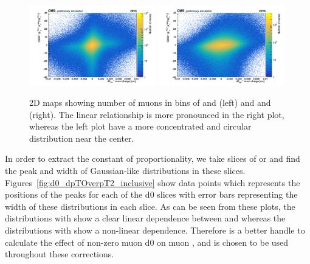 \begin{figure}[h!]
    \centering
    \includegraphics[width=0.49\textwidth]{images_geofit/2D_d0_PV_dpTOverpT2_lowRes.pdf}
    \includegraphics[width=0.49\textwidth]{images_geofit/2D_d0_BS_dpTOverpT2_lowRes.pdf}
    \caption{2D maps showing number of muons in bins of \dptoverptsquare and \dzeroPV (left) and \dptoverptsquare and \dzeroBS (right). The linear relationship is more pronounced in the right plot, whereas the left plot have a more concentrated and circular distribution near the center.}
    \label{fig:2D_d0_dpTOverpT2_inclusive}
\end{figure}

In order to extract the constant of proportionality, we take slices of \dzeroPV or \dzeroBS and find the peak and width of Gaussian-like \dptoverptsquare distributions in these slices. Figures~\ref{fig:d0_dpTOverpT2_inclusive} show data points which represents the positions of the peaks for each of the d0 slices with error bars representing the width of these distributions in each slice. As can be seen from these plots, the distributions with \dzeroBS show a clear linear dependence between \dptoverptsquare and \dzeroBS whereas the distributions with \dzeroPV show a non-linear dependence. Therefore \dzeroBS is a better handle to calculate the effect of non-zero muon d0 on muon \pt, and is chosen to be used throughout these corrections.

